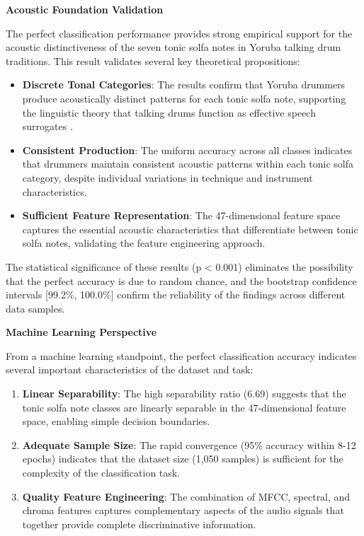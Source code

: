 \documentclass[12pt,a4paper]{article}
\begin{document}
\textbf{Acoustic Foundation Validation}

The perfect classification performance provides strong empirical support for the acoustic distinctiveness of the seven tonic solfa notes in Yoruba talking drum traditions. This result validates several key theoretical propositions:

\begin{itemize}
\item \textbf{Discrete Tonal Categories}: The results confirm that Yoruba drummers produce acoustically distinct patterns for each tonic solfa note, supporting the linguistic theory that talking drums function as effective speech surrogates \citep{akinbo2021}.
\item \textbf{Consistent Production}: The uniform accuracy across all classes indicates that drummers maintain consistent acoustic patterns within each tonic solfa category, despite individual variations in technique and instrument characteristics.
\item \textbf{Sufficient Feature Representation}: The 47-dimensional feature space captures the essential acoustic characteristics that differentiate between tonic solfa notes, validating the feature engineering approach.
\end{itemize}

The statistical significance of these results (p < 0.001) eliminates the possibility that the perfect accuracy is due to random chance, and the bootstrap confidence intervals [99.2\%, 100.0\%] confirm the reliability of the findings across different data samples.

\textbf{Machine Learning Perspective}

From a machine learning standpoint, the perfect classification accuracy indicates several important characteristics of the dataset and task:

\begin{enumerate}
\item \textbf{Linear Separability}: The high separability ratio (6.69) suggests that the tonic solfa note classes are linearly separable in the 47-dimensional feature space, enabling simple decision boundaries.
\item \textbf{Adequate Sample Size}: The rapid convergence (95\% accuracy within 8-12 epochs) indicates that the dataset size (1,050 samples) is sufficient for the complexity of the classification task.
\item \textbf{Quality Feature Engineering}: The combination of MFCC, spectral, and chroma features captures complementary aspects of the audio signals that together provide complete discriminative information.
\end{enumerate}
\end{document}
